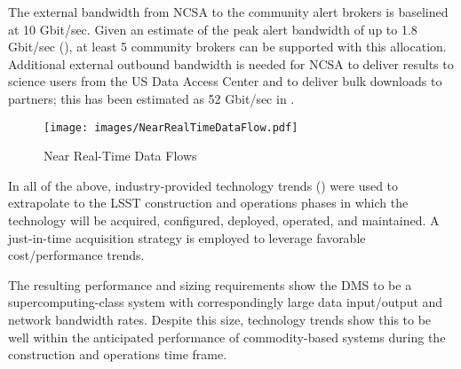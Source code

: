 The external bandwidth from NCSA to the community alert brokers is baselined at 10 Gbit/sec.
Given an estimate of the peak alert bandwidth of up to 1.8 Gbit/sec (), at least 5 community brokers can be supported with this allocation.
Additional external outbound bandwidth is needed for NCSA to deliver results to science users from the US Data Access Center and to deliver bulk downloads to partners; this has been estimated as 52 Gbit/sec in .


\begin{figure}
\centering
\texttt{[image: images/NearRealTimeDataFlow.pdf]}
\caption{Near Real-Time Data Flows}
\label{fig:near-real-time-flows}
\end{figure}

In all of the above, industry-provided technology trends ()
were used to extrapolate to the LSST construction and operations phases in
which the technology will be acquired, configured, deployed, operated, and
maintained. A just-in-time acquisition strategy is employed to leverage
favorable cost/performance trends.

The resulting performance and sizing requirements show the DMS to be a
supercomputing­-class system with correspondingly large data input/output and
network bandwidth rates.  Despite this size, technology trends show this to be
well within the anticipated performance of commodity-based systems during the
construction and operations time frame.
